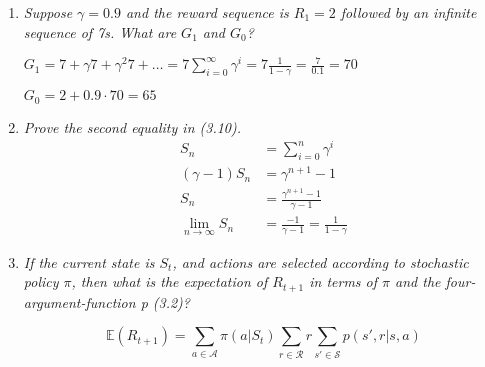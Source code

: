 \documentclass[12pt,a4paper]{article}
\begin{document}
\begin{enumerate}
\item
  \textit{Suppose $\gamma = 0.9$ and the reward sequence is $R_1 = 2$ followed by an infinite
  sequence of 7s. What are $G_1$ and $G_0$?}

  $G_1 = 7 + \gamma 7 + \gamma^2 7 + \dots = 7 \sum\limits_{i = 0}^{\infty} \gamma^i =
  7 \frac{1}{1 - \gamma} = \frac{7}{0.1} = 70$

  $G_0 = 2 + 0.9 \cdot 70 = 65$

\item
  \textit{Prove the second equality in (3.10).}
  \begin{align*}
    S_n &= \sum\limits_{i = 0}^n \gamma^i\\
    (\gamma - 1)S_n &= \gamma^{n + 1} - 1\\
    S_n &= \frac{\gamma^{n + 1} - 1}{\gamma - 1}\\
    \lim_{n \to \infty} S_n &= \frac{ - 1}{\gamma - 1} = \frac{1}{1 - \gamma}
  \end{align*}

\item
  \textit{If the current state is $S_t$, and actions are selected according to stochastic
  policy $\pi$, then what is the expectation of $R_{t+1}$ in terms of $\pi$ and the four-argument-function p (3.2)?}

  \[\mathbb{E}(R_{t + 1}) = \sum\limits_{a \in \mathcal{A}} \pi(a | S_t)
  \sum\limits_{r \in \mathcal{R}} r \sum\limits_{s' \in \mathcal{S}}p(s', r | s, a) \]

\end{enumerate}
\end{document}
